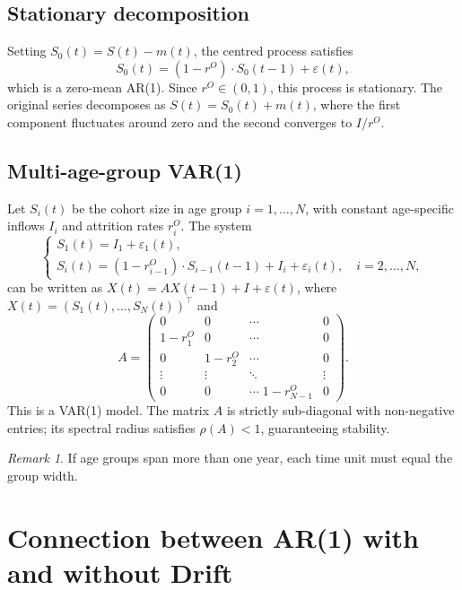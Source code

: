 \documentclass[a4paper,oneside,12pt]{extarticle}
\theoremstyle{plain}
\theoremstyle{definition}
\theoremstyle{remark}
\newtheorem{remark}[proposition]{Remark}
\newcommand*{\ve}{\varepsilon}
\begin{document}
\subsection{Stationary decomposition}

Setting $S_0(t) = S(t) - m(t)$, the centred process satisfies
\[
S_0(t) = (1-r^O)\cdot S_0(t-1) + \ve(t),
\]
which is a zero-mean AR(1). Since $r^O \in (0,1)$, this process is
stationary. The original series decomposes as $S(t) = S_0(t) + m(t)$,
where the first component fluctuates around zero and the second converges
to $I/r^O$.

\subsection{Multi-age-group VAR(1)}

Let $S_i(t)$ be the cohort size in age group $i = 1,\ldots,N$, with
constant age-specific inflows $I_i$ and attrition rates $r_i^O$. The
system
\[
\begin{cases}
S_1(t) = I_1 + \ve_1(t),\\
S_i(t) = (1-r_{i-1}^O)\cdot S_{i-1}(t-1) + I_i + \ve_i(t),
  \quad i = 2,\ldots,N,
\end{cases}
\]
can be written as $X(t) = AX(t-1) + I + \ve(t)$, where
$X(t) = (S_1(t),\ldots,S_N(t))^\top$ and
\[
A =
\begin{pmatrix}
0 & 0 & \cdots & 0\\
1-r_1^O & 0 & \cdots & 0\\
0 & 1-r_2^O & \cdots & 0\\
\vdots & \vdots & \ddots & \vdots\\
0 & 0 & \cdots\; 1-r_{N-1}^O & 0
\end{pmatrix}.
\]
This is a VAR(1) model. The matrix $A$ is strictly sub-diagonal with
non-negative entries; its spectral radius satisfies $\rho(A) < 1$,
guaranteeing stability.

\begin{remark}
If age groups span more than one year, each time unit must equal the
group width.
\end{remark}


\section{Connection between AR(1) with and without Drift}
\label{sec:ar1_drift}
\end{document}
